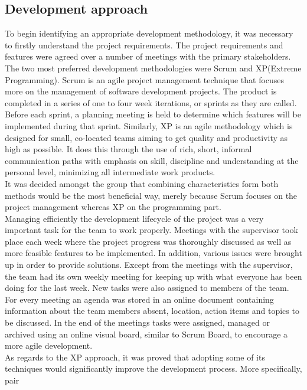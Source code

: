 \subsection{Development approach} 
To begin identifying an appropriate development methodology, it was necessary to firstly understand 
the project requirements. The project requirements and features were agreed over a number of 
meetings with the primary stakeholders.\\ 
The two most preferred development methodologies were 
Scrum and XP(Extreme Programming). Scrum is an agile project management technique that focuses more 
on the management of software development projects. The product is completed in a series of one to 
four week iterations, or sprints as they are called. Before each sprint, a planning meeting is held 
to determine which features will be implemented during that sprint. Similarly, XP is an agile 
methodology which is designed for small, co-located teams aiming to get quality and productivity as 
high as possible. It does this through the use of rich, short, informal communication paths with 
emphasis on skill, discipline and understanding at the personal level, minimizing all intermediate 
work products.\\ 
It was decided amongst the group that combining characteristics form both methods 
would be the most beneficial way, merely because Scrum focuses on the project management whereas XP 
on the programming part.\\ 
Managing efficiently the development lifecycle of the project was a very 
important task for the team to work properly. Meetings with the supervisor took place each week 
where the project progress was thoroughly discussed as well as more feasible features to be 
implemented. In addition, various issues were brought up in order to provide solutions. Except from 
the meetings with the supervisor, the team had its own weekly meeting for keeping up with what 
everyone has been doing for the last week. New tasks were also assigned to members of the team. For 
every meeting an agenda was stored in an online document containing information about the team 
members absent, location, action items and topics to be discussed. In the end of the meetings tasks 
were assigned, managed or archived using an online visual board, similar to Scrum Board, to 
encourage a more agile development.\\ 
As regards to the XP approach, it was proved that adopting 
some of its techniques would significantly improve the development process. More specifically, pair 
